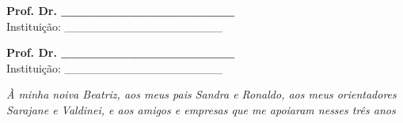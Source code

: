 \documentclass[
    12pt,                %
    oneside,            %
    a4paper,            %
    english,            %
    brazil                %
    ]{abntex2ppgsi}
\begin{document}
\begin{folhadeaprovacao}
\begin{center}
\vspace*{2cm}

\textbf{Prof. Dr. \_\_\_\_\_\_\_\_\_\_\_\_\_\_\_\_\_\_}
\\ Instituição: \_\_\_\_\_\_\_\_\_\_\_\_\_\_\_\_\_\_\_

\vspace*{2cm}

\textbf{Prof. Dr. \_\_\_\_\_\_\_\_\_\_\_\_\_\_\_\_\_\_}
\\ Instituição: \_\_\_\_\_\_\_\_\_\_\_\_\_\_\_\_\_\_\_

\end{center}

\end{folhadeaprovacao}

%
%
\begin{dedicatoria}
   \vspace*{\fill}
   \centering
   \noindent
   \textit{À minha noiva Beatriz, aos meus pais Sandra e Ronaldo, aos meus orientadores Sarajane e Valdinei, e aos amigos e empresas que me apoiaram nesses três anos}
     \vspace*{\fill}
\end{dedicatoria}

%
%
%

\end{document}
